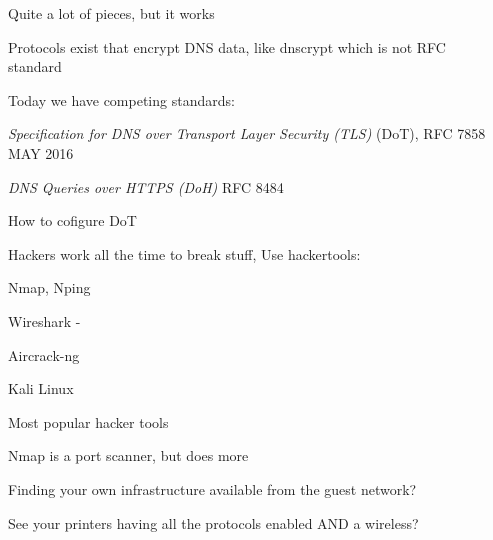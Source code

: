 \documentclass[Screen16to9,17pt]{foils}
\begin{document}
\centerline{Quite a lot of pieces, but it works}





\begin{list1}
\item Protocols exist that encrypt DNS data, like dnscrypt which is not RFC\\ standard  
\item Today we have competing standards:
\item
\emph{Specification for DNS over Transport Layer Security (TLS)} (DoT), RFC 7858 MAY 2016\\

\item \emph{DNS Queries over HTTPS (DoH)} RFC 8484

\item How to cofigure DoT 
\end{list1}








\begin{list2}
\item Hackers work all the time to break stuff, Use hackertools:
\item Nmap, Nping 
\item Wireshark - 
\item Aircrack-ng 
\item Kali Linux 
\end{list2}

\vskip 5mm
\centerline{Most popular hacker tools }





\begin{list2}
\item Nmap is a port scanner, but does more
\item Finding your own infrastructure available from the guest network?
\item See your printers having all the protocols enabled AND a wireless?
\end{list2}
\end{document}
